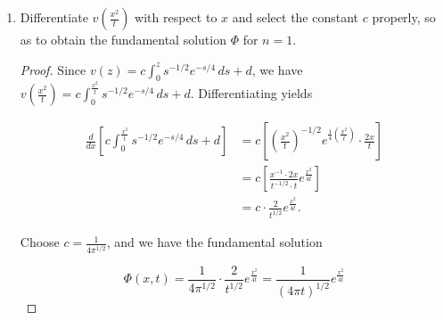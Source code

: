 \documentclass[11pt,oneside,english]{amsart}
\theoremstyle{definition}
\newcommand{\dd}[2]{\frac{d{#1}}{d{#2}}}
\begin{document}
\begin{enumerate}
\begin{enumerate}
\begin{proof}
\[(**) \hspace{5mm}4zf'(z)+(2+z)f(z)=0\]

which is a homogeneous first order ODE and can be solved via an integrating factor. For $z\neq0$, we have
\[
f'(z)=\frac{2+z}{4z}f(z)=0
\]

so our integrating factor is 

\[
I(z)=e^{\int\frac{2+z}{4z}\,dz}=e^{(1/2)\ln |z|+(1/4)z}=z^{1/2}e^{z/4},
\]

and $(**)$ yields

\begin{align*}
4zf'(z)+(2+z)f(z)&=0\\[2mm]
\dd{}{z}\left(z^{1/2}e^{z/4}f(z)\right)&=\dd{}{z}(0)\\[2mm]
z^{1/2}e^{z/4}f(z)&=c\\[2mm]
f(z)&=cz^{-1/2}e^{-z/4}\\[2mm]
v'(z)&=cz^{-1/2}e^{-z/4}\\[2mm]
\int_0^zv'(s)\,ds&=c\int_0^zs^{-1/2}e^{-s/4}\,ds\\[2mm]
v(z)&=c\int_0^zs^{-1/2}e^{-s/4}\,ds+d\\[2mm]
\end{align*}
\end{proof}


\item Differentiate $v\left(\frac{x^2}{t}\right)$ with respect to $x$ and select the constant $c$ properly, so as to obtain the fundamental solution $\Phi$ for $n=1$. 

\begin{proof}
Since $\displaystyle v(z)=c\int_0^zs^{-1/2}e^{-s/4}\,ds+d$, we have $\displaystyle v\left(\frac{x^2}{t}\right)=c\int_0^{\frac{x^2}{t}}s^{-1/2}e^{-s/4}\,ds+d$. Differentiating yields

\begin{align*}
\dd{}{x}\left[c\int_0^{\frac{x^2}{t}}s^{-1/2}e^{-s/4}\,ds+d\right]&=c\left[\left(\frac{x^2}{t}\right)^{-1/2}e^{\frac{1}{4}\left(\frac{x^2}{t}\right)}\cdot\frac{2x}{t}\right]\\[2mm]
&=c\left[\frac{x^{-1}\cdot2x}{t^{-1/2}\cdot t}e^{\frac{x^2}{4t}}\right]\\[2mm]
&=c\cdot\frac{2}{t^{1/2}}e^{\frac{x^2}{4t}}.
\end{align*}

Choose $\displaystyle c=\frac{1}{4\pi^{1/2}}$, and we have the fundamental solution

\[
\Phi(x,t)=\frac{1}{4\pi^{1/2}}\cdot\frac{2}{t^{1/2}}e^{\frac{x^2}{4t}}=\frac{1}{(4\pi t)^{1/2}}e^{\frac{x^2}{4t}}
\]
\end{proof}
\end{enumerate}




\end{enumerate}
\end{document}

